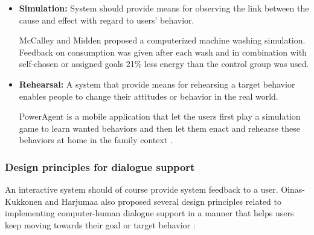 \begin{itemize}
	\item \textbf{Simulation:}
	System should provide means for observing the link between the cause and effect with regard to users’ behavior.
	
	McCalley and Midden \cite{mccalley2002energy} proposed a computerized	machine washing	simulation. Feedback on consumption was given after	each wash and in combination with self-chosen or	assigned goals 21\% less energy than the control group was used.
		
	\item \textbf{Rehearsal:}
	A system that provide means for rehearsing a target behavior enables people to change their attitudes or behavior in the real world.
	
	PowerAgent is a mobile application that let the users first play a simulation game to learn wanted behaviors and then let them enact and rehearse these behaviors at home in the family context \cite{bang2007promoting}.
\end{itemize}


\subsubsection{Design principles for dialogue support}

An interactive system should of course provide system feedback to a user. Oinas-Kukkonen and Harjumaa also proposed several design principles related to implementing computer-human dialogue support in a manner that helps users keep moving towards their goal or target behavior \cite{oinas2009persuasive}:

